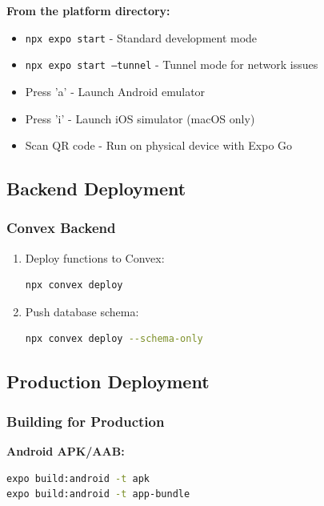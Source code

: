 \documentclass[a4paper,12pt]{article}
\begin{document}
\begin{tcolorbox}[colback=lightgray,colframe=black,title=\textbf{Running Options}]
\textbf{From the platform directory:}
\begin{itemize}[leftmargin=*]
    \item \texttt{npx expo start} - Standard development mode
    \item \texttt{npx expo start --tunnel} - Tunnel mode for network issues
    \item Press 'a' - Launch Android emulator
    \item Press 'i' - Launch iOS simulator (macOS only)
    \item Scan QR code - Run on physical device with Expo Go
\end{itemize}
\end{tcolorbox}

\subsection{Backend Deployment}

\subsubsection{Convex Backend}

\begin{enumerate}
    \item Deploy functions to Convex:
    \begin{lstlisting}[language=bash]
npx convex deploy
    \end{lstlisting}
    
    \item Push database schema:
    \begin{lstlisting}[language=bash]
npx convex deploy --schema-only
    \end{lstlisting}
\end{enumerate}

\subsection{Production Deployment}

\subsubsection{Building for Production}

\textbf{Android APK/AAB:}
\begin{lstlisting}[language=bash]
expo build:android -t apk
expo build:android -t app-bundle
\end{lstlisting}
\end{document}
